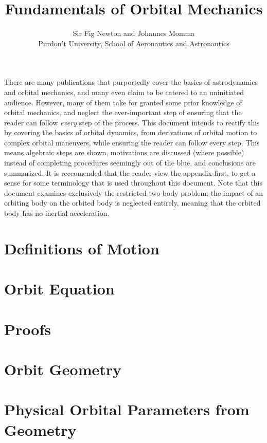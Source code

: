 \documentclass{article}
\title{Fundamentals of Orbital Mechanics}
\author{Sir Fig Newton and Johannes Momma\\Purdon't University, School of Aeronautics and Astronautics}
\date{}
\begin{document}
\maketitle

There are many publications that purportedly cover the basics of astrodynamics and orbital mechanics, and many even claim to be catered to an uninitiated audience. However, many of them take for granted some prior knowledge of orbital mechanics, and neglect the ever-important step of ensuring that the reader can follow \textit{every} step of the process. This document intends to rectify this by covering the basics of orbital dynamics, from derivations of orbital motion to complex orbital maneuvers, while ensuring the reader can follow every step. This means algebraic steps are shown, motivations are discussed (where possible) instead of completing procedures seemingly out of the blue, and conclusions are summarized. It is reccomended that the reader view the appendix first, to get a sense for some terminology that is used throughout this document. Note that this document examines exclusively the restricted two-body problem; the impact of an orbiting body on the orbited body is neglected entirely, meaning that the orbited body has no inertial acceleration.

\pagebreak
\tableofcontents

\pagebreak
\section{Definitions of Motion}\label{Sec:Motion}


\pagebreak
\section{Orbit Equation}\label{Sec:Orbit Equation}


\pagebreak
\section{Proofs}\label{sec:Proofs}


\pagebreak
\section{Orbit Geometry}\label{sec:Orbit Geometry}


\pagebreak
\section{Physical Orbital Parameters from Geometry}\label{sec:Orbital Parameters from Geometry}

\end{document}

